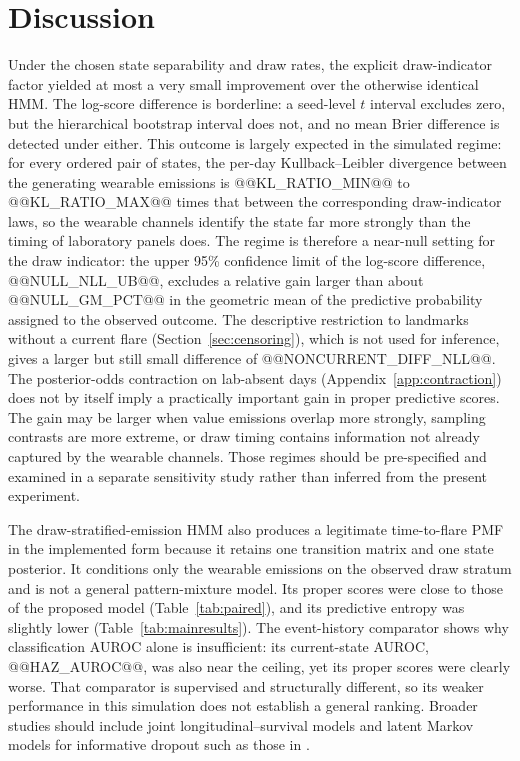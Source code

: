 \documentclass{ieeeaccess}
\begin{document}
\section{Discussion}\label{sec:discussion}
Under the chosen state separability and draw rates, the explicit draw-indicator factor yielded at most a very small improvement over the otherwise identical HMM. The log-score difference is borderline: a seed-level $t$ interval excludes zero, but the hierarchical bootstrap interval does not, and no mean Brier difference is detected under either. This outcome is largely expected in the simulated regime: for every ordered pair of states, the per-day Kullback--Leibler divergence between the generating wearable emissions is @@KL_RATIO_MIN@@ to @@KL_RATIO_MAX@@ times that between the corresponding draw-indicator laws, so the wearable channels identify the state far more strongly than the timing of laboratory panels does. The regime is therefore a near-null setting for the draw indicator: the upper 95\% confidence limit of the log-score difference, @@NULL_NLL_UB@@, excludes a relative gain larger than about @@NULL_GM_PCT@@ in the geometric mean of the predictive probability assigned to the observed outcome. The descriptive restriction to landmarks without a current flare (Section~\ref{sec:censoring}), which is not used for inference, gives a larger but still small difference of @@NONCURRENT_DIFF_NLL@@. The posterior-odds contraction on lab-absent days (Appendix~\ref{app:contraction}) does not by itself imply a practically important gain in proper predictive scores. The gain may be larger when value emissions overlap more strongly, sampling contrasts are more extreme, or draw timing contains information not already captured by the wearable channels. Those regimes should be pre-specified and examined in a separate sensitivity study rather than inferred from the present experiment.

The draw-stratified-emission HMM also produces a legitimate time-to-flare PMF in the implemented form because it retains one transition matrix and one state posterior. It conditions only the wearable emissions on the observed draw stratum and is not a general pattern-mixture model. Its proper scores were close to those of the proposed model (Table~\ref{tab:paired}), and its predictive entropy was slightly lower (Table~\ref{tab:mainresults}). The event-history comparator shows why classification AUROC alone is insufficient: its current-state AUROC, @@HAZ_AUROC@@, was also near the ceiling, yet its proper scores were clearly worse. That comparator is supervised and structurally different, so its weaker performance in this simulation does not establish a general ranking. Broader studies should include joint longitudinal--survival models and latent Markov models for informative dropout such as those in \cite{bartolucci2015,bartolucci2019,marino2020}.
\end{document}
